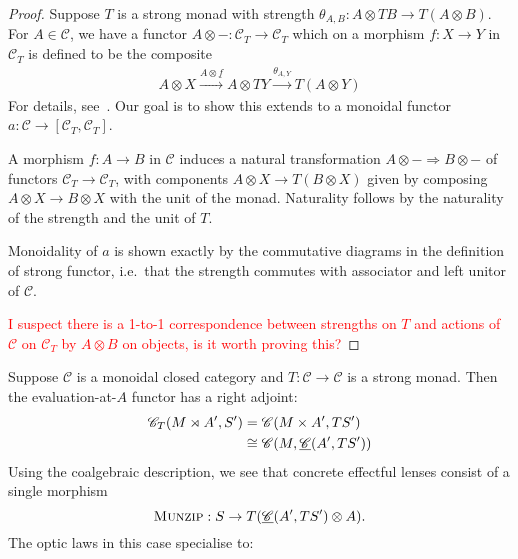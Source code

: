 \documentclass[11pt,letterpaper]{article}
\theoremstyle{plain}
\theoremstyle{definition}
\newcommand{\C}{\mathscr{C}}
\newcommand{\homC}{\underline{\C}}
\newcommand{\munzip}{\textsc{Munzip}}
\newcommand{\todo}[1]{\textcolor{red}{\small #1}}
\begin{document}
\begin{proof}
Suppose $T$ is a strong monad with strength $\theta_{A, B} : A \otimes T B \to T(A \otimes B)$. For $A \in \C$, we have a functor $A \otimes - : \C_T \to \C_T$ which on a morphism $f : X \to Y$ in $\C_T$ is defined to be the composite
\begin{align*}
A \otimes X \xrightarrow{A \otimes \underline{f}} A \otimes TY \xrightarrow{\theta_{A, Y}} T(A \otimes Y)
\end{align*}
For details, see~\cite[Theorem 4.2]{PremonoidalCategories}. Our goal is to show this extends to a monoidal functor $a : \C \to [\C_T, \C_T]$.

A morphism $f : A \to B$ in $\C$ induces a natural transformation $A \otimes - \Rightarrow B \otimes -$ of functors $\C_T \to \C_T$, with components $A \otimes X \to T(B \otimes X)$ given by composing $A \otimes X \to B \otimes X$ with the unit of the monad. Naturality follows by the naturality of the strength and the unit of $T$.

Monoidality of $a$ is shown exactly by the commutative diagrams in the definition of strong functor, i.e.\ that the strength commutes with associator and left unitor of $\C$.

\todo{I suspect there is a 1-to-1 correspondence between strengths on $T$ and actions of $\C$ on $\C_T$ by $A \otimes B$ on objects, is it worth proving this?}
\end{proof}

Suppose $\C$ is a monoidal closed category and $T : \C \to \C$ is a strong monad. Then the evaluation-at-$A$ functor has a right adjoint:
\begin{align*}
\C_T(M \monact A', S')
&= \C(M \times A', T S') \\
&\cong \C(M, \homC(A', T S'))
\end{align*}
Using the coalgebraic description, we see that concrete effectful lenses consist of a single morphism \[\munzip : S \to T(\homC(A', T S') \otimes A).\] The optic laws in this case specialise to:
\end{document}
